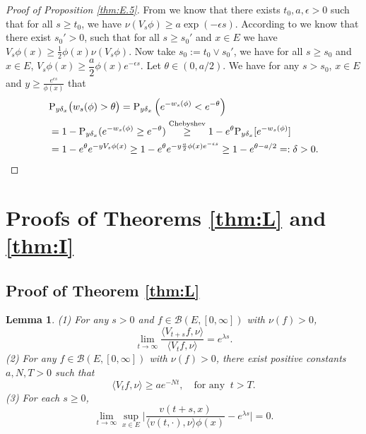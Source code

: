 \documentclass[12pt,a4paper]{amsart}
\numberwithin{equation}{section}
\theoremstyle{plain}
\newtheorem{lem}[thm]{Lemma}
\theoremstyle{definition}
\theoremstyle{remark}
\begin{document}
\begin{proof}[Proof of Proposition \ref{thm:E.5}]
	From \cite[(3.20)]{LiuRenSongSun2020} we know that there exists $t_0,a,\epsilon>0$ such that for all $s\geq t_0$, we have $\nu(V_{s}\phi) \geq a \exp(-\epsilon s)$.
	According to \cite[Proposition 2.2]{LiuRenSongSun2020} we know that there exist $s_0'>0$, such that for all $s\geq s_0'$ and $x\in E$ we have $V_{s}\phi(x)\ge\frac{1}{2}\phi(x)\nu(V_{s}\phi)$.
	Now take $s_0:= t_0 \vee s_0'$, we have for all $s\geq s_0$ and $x\in E$, $V_{s}\phi(x)\geq \dfrac{a}{2}\phi(x)e^{-\epsilon s}$.
	Let $\theta \in (0,a/2)$.
	We have for any $s>s_0$, $x\in E$ and $y\geq \frac{e^{\epsilon s}}{\phi(x)}$ that
\begin{align}
	&\mathrm P_{y\delta_x}\big(w_s(\phi)>\theta\big)
	=\mathrm P_{y\delta_x}\left(e^{-w_s(\phi)}<e^{-\theta}\right)
	\\&=1-\mathrm P_{y\delta_x}(e^{-w_s(\phi)}\geq e^{-\theta})
	\overset{\text{Chebyshev}}\geq 1-e^{\theta}\mathrm P_{y\delta_x}[e^{- w_s(\phi)}]
	\\&=1-e^{\theta}e^{-yV_{s}\phi(x)}
	\geq 1-e^{\theta}e^{-y \frac{a}{2}\phi(x)e^{-\epsilon s}}
	\geq 1 - e^{\theta - a/2}=: \delta >0.
	\qedhere
\end{align}
\end{proof}



\section{Proofs of Theorems \ref{thm:L} and \ref{thm:I}}



\subsection{Proof of Theorem \ref{thm:L}}

\begin{lem}\label{lem:ratio limit}
	(1) For any $s>0$ and $f\in\mathcal B(E,[0,\infty])$ with $\nu(f)>0$, 
	\begin{equation}\label{integ ratio limit}
		\lim_{t\to\infty}\dfrac{\langle V_{t+s}f, \nu\rangle}{\langle V_{t}f, \nu\rangle}=e^{\lambda s}.
	\end{equation}
	(2)
		For any $f\in\mathcal B(E,[0,\infty])$ with $\nu(f)>0$, there exist positive constants $a,N,T>0$ such that
	\begin{equation}\label{inequ:lower}
		\langle V_{t}f, \nu\rangle\geq ae^{-Nt},\quad \mbox{for any }\ t>T.
	\end{equation}
	(3) For each $s\geq 0$,
	\begin{equation} \label{one point ratio limit}
		\lim_{t\to \infty} \sup_{x\in E}\Big|\frac{v(t+s,x)}{\langle v(t,\cdot),\nu\rangle\phi(x) } - e^{\lambda s} \Big|=0.
	\end{equation}
\end{lem}
\end{document}
